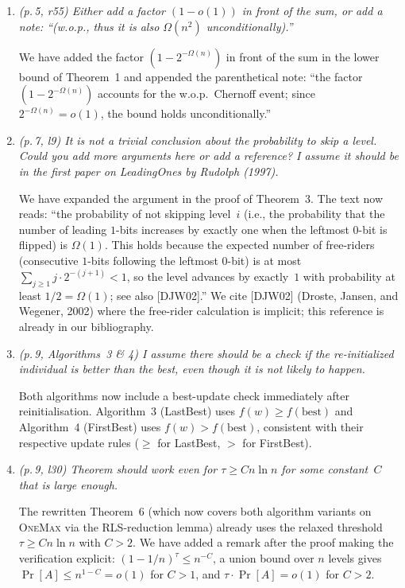 \documentclass[11pt]{article}
\newcommand{\RC}[1]{\textcolor{revcolor}{\textit{#1}}}
\newcommand{\resp}[1]{\smallskip\noindent #1\medskip}
\begin{document}
\begin{enumerate}[label=\textbf{P\arabic*.},leftmargin=*]
\item \RC{(p.\,5, r55) Either add a factor $(1-o(1))$ in front of the sum, or
add a note: ``(w.o.p., thus it is also $\Omega(n^2)$ unconditionally).''}

\resp{We have added the factor $(1-2^{-\Omega(n)})$ in front of the sum in
the lower bound of Theorem~1 and appended the parenthetical note: ``the factor
$(1-2^{-\Omega(n)})$ accounts for the w.o.p.\ Chernoff event; since
$2^{-\Omega(n)}=o(1)$, the bound holds unconditionally.''}

\item \RC{(p.\,7, l9) It is not a trivial conclusion about the probability to
skip a level. Could you add more arguments here or add a reference? I assume
it should be in the first paper on LeadingOnes by Rudolph (1997).}

\resp{We have expanded the argument in the proof of Theorem~3.  The text now
reads: ``the probability of not skipping level~$i$ (i.e., the probability that
the number of leading $1$-bits increases by exactly one when the leftmost
$0$-bit is flipped) is $\Omega(1)$.  This holds because the expected number of
free-riders (consecutive $1$-bits following the leftmost $0$-bit) is at most
$\sum_{j\ge1}j\cdot 2^{-(j+1)}<1$, so the level advances by exactly~$1$ with
probability at least $1/2 = \Omega(1)$; see also [DJW02].''
We cite [DJW02] (Droste, Jansen, and Wegener, 2002) where the free-rider
calculation is implicit; this reference is already in our bibliography.}

\item \RC{(p.\,9, Algorithms~3 \& 4) I assume there should be a check if the
re-initialized individual is better than the best, even though it is not likely
to happen.}

\resp{Both algorithms now include a best-update check immediately after
reinitialisation.  Algorithm~3 (LastBest) uses
$f(w) \geq f(\text{best})$ and Algorithm~4 (FirstBest) uses
$f(w) > f(\text{best})$, consistent with their respective update rules
($\geq$ for LastBest, $>$ for FirstBest).}

\item \RC{(p.\,9, l30) Theorem should work even for
$\tau\ge Cn\ln n$ for some constant~$C$ that is large enough.}

\resp{The rewritten Theorem~6 (which now covers both algorithm variants on
\textsc{OneMax} via the RLS-reduction lemma) already uses the relaxed
threshold $\tau \ge Cn\ln n$ with $C>2$.  We have added a remark after the
proof making the verification explicit: $(1-1/n)^\tau \le n^{-C}$, a union
bound over $n$ levels gives $\Pr[A]\le n^{1-C}=o(1)$ for $C>1$, and
$\tau\cdot\Pr[A]=o(1)$ for $C>2$.}


\end{enumerate}
\end{document}
